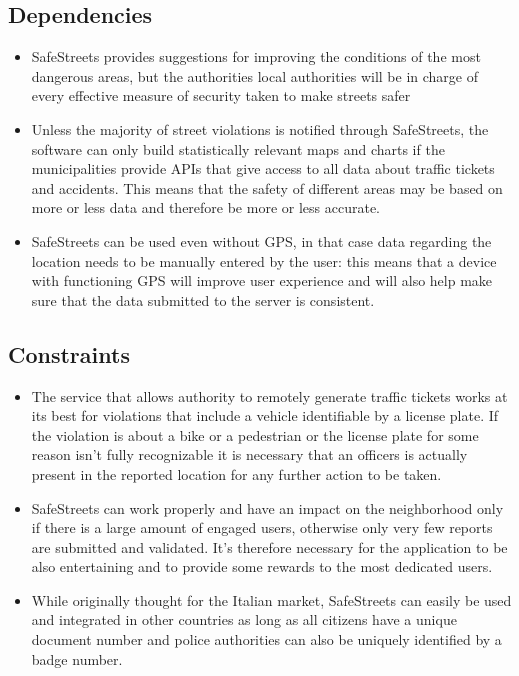 \subsection{Dependencies}
  \begin{itemize}
    \item SafeStreets provides suggestions for improving the conditions of the most dangerous areas, but the authorities local authorities will be in charge of every effective measure of security taken to make streets safer
    \item Unless the majority of street violations is notified through SafeStreets, the software can only build statistically relevant maps and charts if the municipalities provide APIs that give access to all data about traffic tickets and accidents. This means that the safety of different areas may be based on more or less data and therefore be more or less accurate.
    \item SafeStreets can be used even without GPS, in that case data regarding the location needs to be manually entered by the user: this means that a device with functioning GPS will improve user experience and will also help make sure that the data submitted to the server is consistent.
  \end{itemize}

\subsection{Constraints}
  \begin{itemize}
    \item The service that allows authority to remotely generate traffic tickets works at its best for violations that include a vehicle identifiable by a license plate. If the violation is about a bike or a pedestrian or the license plate for some reason isn't fully recognizable it is necessary that an officers is actually present in the reported location for any further action to be taken.
    \item SafeStreets can work properly and have an impact on the neighborhood only if there is a large amount of engaged users, otherwise only very few reports are submitted and validated. It's therefore necessary for the application to be also entertaining and to provide some rewards to the most dedicated users.
    \item While originally thought for the Italian market, SafeStreets can easily be used and integrated in other countries as long as all citizens have a unique document number and police authorities can also be uniquely identified by a badge number. 
  \end{itemize}
